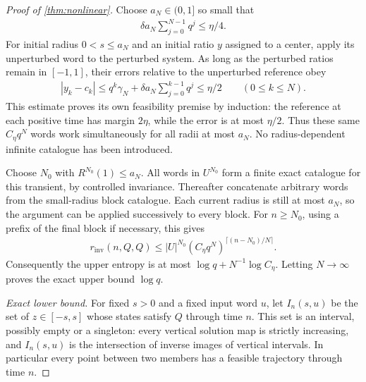\documentclass[11pt,a4paper]{article}
\theoremstyle{definition}
\theoremstyle{remark}
\begin{document}
\begin{proof}[Proof of \cref{thm:nonlinear}]
Choose \(a_N\in(0,1]\) so small that
\begin{align}\label{eq:small-radius-block}
 \delta a_N\sum_{j=0}^{N-1}q^j\leq\eta/4.
\end{align}
For initial radius \(0<s\leq a_N\) and an initial ratio \(y\) assigned to a center, apply its unperturbed word to the perturbed system. As long as the perturbed ratios remain in \([-1,1]\), their errors relative to the unperturbed reference obey
\begin{align}
 |y_k-c_k|
 \leq q^k\gamma_N+\delta a_N\sum_{j=0}^{k-1}q^j
 \leq\eta/2\qquad(0\leq k\leq N).
\end{align}
This estimate proves its own feasibility premise by induction: the reference at each positive time has margin \(2\eta\), while the error is at most \(\eta/2\). Thus these same \(C_\eta q^N\) words work simultaneously for all radii at most \(a_N\). No radius-dependent infinite catalogue has been introduced.

Choose \(N_0\) with \(R^{N_0}(1)\leq a_N\). All words in \(U^{N_0}\) form a finite exact catalogue for this transient, by controlled invariance. Thereafter concatenate arbitrary words from the small-radius block catalogue. Each current radius is still at most \(a_N\), so the argument can be applied successively to every block. For \(n\geq N_0\), using a prefix of the final block if necessary, this gives
\begin{align}
 r_{\mathrm{inv}}(n,Q,Q)
 \leq |U|^{N_0}(C_\eta q^N)^{\lceil(n-N_0)/N\rceil}.
\end{align}
Consequently the upper entropy is at most
\(\log q+N^{-1}\log C_\eta\). Letting \(N\to\infty\) proves the exact upper bound \(\log q\).

\emph{Exact lower bound.}
For fixed \(s>0\) and a fixed input word \(u\), let \(I_n(s,u)\) be the set of \(z\in[-s,s]\) whose states satisfy \(Q\) through time \(n\). This set is an interval, possibly empty or a singleton: every vertical solution map is strictly increasing, and \(I_n(s,u)\) is the intersection of inverse images of vertical intervals. In particular every point between two members has a feasible trajectory through time \(n\).


\end{proof}
\end{document}
